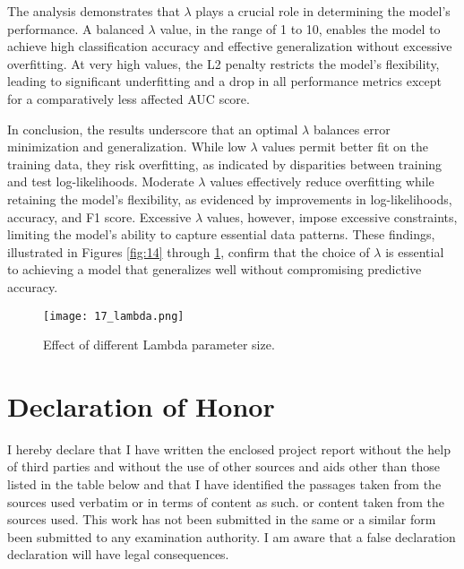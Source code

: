 \documentclass[a4paper,oneside,bibliography=totoc]{scrartcl}
\begin{document}
The analysis demonstrates that $\lambda$ plays a crucial role in determining the model’s performance. A balanced $\lambda$ value, in the range of 1 to 10, enables the model to achieve high classification accuracy and effective generalization without excessive overfitting. At very high values, the L2 penalty restricts the model’s flexibility, leading to significant underfitting and a drop in all performance metrics except for a comparatively less affected AUC score.

In conclusion, the results underscore that an optimal $\lambda$ balances error minimization and generalization. While low $\lambda$ values permit better fit on the training data, they risk overfitting, as indicated by disparities between training and test log-likelihoods. Moderate $\lambda$ values effectively reduce overfitting while retaining the model’s flexibility, as evidenced by improvements in log-likelihoods, accuracy, and F1 score. Excessive $\lambda$ values, however, impose excessive constraints, limiting the model’s ability to capture essential data patterns. These findings, illustrated in Figures \ref{fig:14} through \ref{fig:17}, confirm that the choice of $\lambda$ is essential to achieving a model that generalizes well without compromising predictive accuracy.



\begin{figure}[H]
    \centering
    \texttt{[image: 17\_lambda.png]}
    \caption{Effect of different Lambda parameter size.}
    \label{fig:17}
\end{figure}
 

\clearpage
\section*{Declaration of Honor}

I hereby declare that I have written the enclosed 
project report without the help of third parties and without the use of other
sources and aids other than those listed in the table below
and that I have identified the passages taken from the sources used verbatim or in terms of content as such.
or content taken from the sources used. This work has not been submitted in the same or a similar form
been submitted to any examination authority. I am aware that a false declaration
declaration will have legal consequences.
\end{document}

